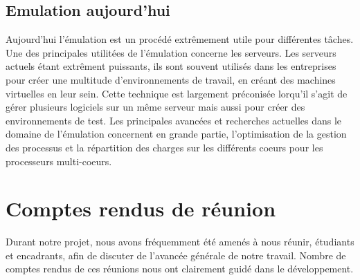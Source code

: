 \documentclass{report}
\begin{document}
\section*{Emulation aujourd'hui}
Aujourd'hui l'émulation est un procédé extrêmement utile pour différentes tâches. Une des principales utilitées de l'émulation concerne les serveurs. Les serveurs actuels étant extrêment puissants, ils sont souvent utilisés dans les entreprises pour créer une multitude d'environnements de travail, en créant des machines virtuelles en leur sein. Cette technique est largement préconisée lorqu'il s'agit de gérer plusieurs logiciels sur un même serveur mais aussi pour créer des environnements de test. 
Les principales avancées et recherches actuelles dans le domaine de l'émulation concernent en grande partie, l'optimisation de la gestion des processus et la répartition des charges sur les différents coeurs pour les processeurs multi-coeurs.


\appendix
\chapter{Comptes rendus de réunion}
Durant notre projet, nous avons fréquemment été amenés à nous réunir, étudiants et encadrants, afin de discuter de l'avancée générale de notre travail.
Nombre de comptes rendus de ces réunions nous ont clairement guidé dans le développement.
\end{document}
